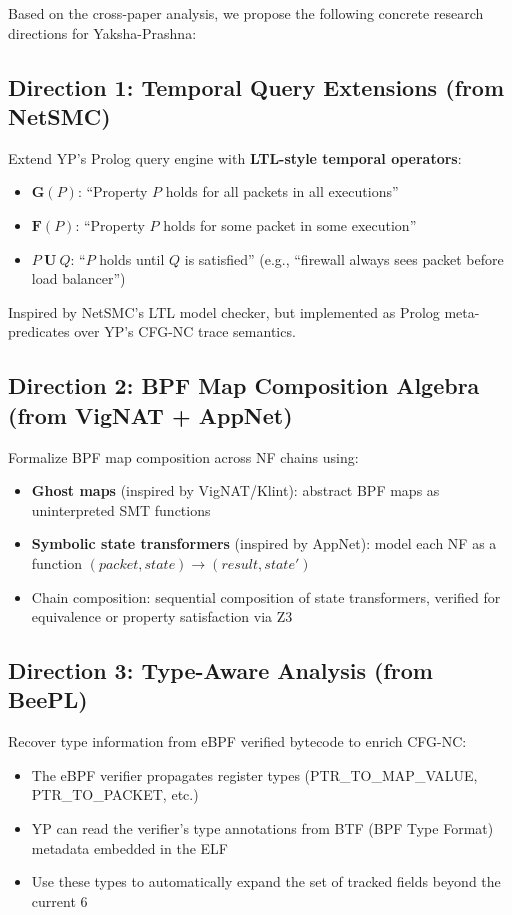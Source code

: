 \documentclass[12pt, a4paper]{article}
\begin{document}
Based on the cross-paper analysis, we propose the following concrete research directions for Yaksha-Prashna:

\subsection{Direction 1: Temporal Query Extensions (from NetSMC)}

Extend YP's Prolog query engine with \textbf{LTL-style temporal operators}:
\begin{itemize}
  \item $\mathbf{G}(P)$: ``Property $P$ holds for all packets in all executions''
  \item $\mathbf{F}(P)$: ``Property $P$ holds for some packet in some execution''
  \item $P\ \mathbf{U}\ Q$: ``$P$ holds until $Q$ is satisfied'' (e.g., ``firewall always sees packet before load balancer'')
\end{itemize}
Inspired by NetSMC's LTL model checker, but implemented as Prolog meta-predicates over YP's CFG-NC trace semantics.

\subsection{Direction 2: BPF Map Composition Algebra (from VigNAT + AppNet)}

Formalize BPF map composition across NF chains using:
\begin{itemize}
  \item \textbf{Ghost maps} (inspired by VigNAT/Klint): abstract BPF maps as uninterpreted SMT functions
  \item \textbf{Symbolic state transformers} (inspired by AppNet): model each NF as a function $(packet, state) \to (result, state')$
  \item Chain composition: sequential composition of state transformers, verified for equivalence or property satisfaction via Z3
\end{itemize}

\subsection{Direction 3: Type-Aware Analysis (from BeePL)}

Recover type information from eBPF verified bytecode to enrich CFG-NC:
\begin{itemize}
  \item The eBPF verifier propagates register types (PTR\_TO\_MAP\_VALUE, PTR\_TO\_PACKET, etc.)
  \item YP can read the verifier's type annotations from BTF (BPF Type Format) metadata embedded in the ELF
  \item Use these types to automatically expand the set of tracked fields beyond the current 6
\end{itemize}
\end{document}
